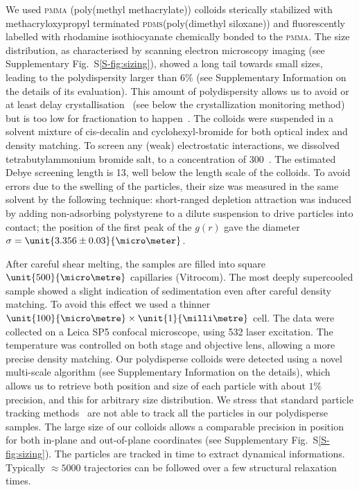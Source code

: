 We used \textsc{pmma} (poly(methyl methacrylate)) colloids sterically stabilized with methacryloxypropyl terminated \textsc{pdms}(poly(dimethyl siloxane)) and fluorescently labelled with rhodamine isothiocyanate chemically bonded to the \textsc{pmma}. The size distribution, as characterised by scanning electron microscopy imaging (see Supplementary Fig.~S\ref{S-fig:sizing}), showed a long tail towards small sizes, leading to the polydispersity larger than 6\% (see Supplementary Information on the details of its evaluation). This amount of polydispersity allows us to avoid or at least delay crystallisation~\cite{Zaccarelli2009} (see below the crystallization monitoring method) but is too low for fractionation to happen~\citep{Fasolo2003}. The colloids were suspended in a solvent mixture of cis-decalin and cyclohexyl-bromide for both optical index and density matching. To screen any (weak) electrostatic interactions, we dissolved tetrabutylammonium bromide salt, to a concentration of \unit{300}{\nano\mole\per\liter}~\citep{royall2005}. The estimated Debye screening length is \unit{13}{\nano\metre}, well below the length scale of the colloids. To avoid errors due to the swelling of the particles, their size was measured in the same solvent by the following technique: short-ranged depletion attraction was induced by adding non-adsorbing polystyrene to a dilute suspension to drive particles into contact; the position of the first peak of the $g(r)$ gave the diameter $\sigma = \unit{3.356\pm0.03}{\micro\meter}$.

After careful shear melting, the samples are filled into square $\unit{500}{\micro\metre}$ capillaries (Vitrocom). The most deeply supercooled sample showed a slight indication of sedimentation even after careful density matching. To avoid this effect we used a thinner $\unit{100}{\micro\metre}\times\unit{1}{\milli\metre}$ cell. The data were collected on a Leica SP5 confocal microscope, using \unit{532}{\nano\meter} laser excitation. The temperature was controlled on both stage and objective lens, allowing a more precise density matching. Our polydisperse colloids were detected using a novel multi-scale algorithm (see Supplementary Information on the details), which allows us to retrieve both position and size of each particle with about $1\%$ precision, and this for arbitrary size distribution. We stress that standard particle tracking methods~\cite{kegel2000swe, weeks2000} are not able to track all the particles in our polydisperse samples. The large size of our colloids allows a comparable precision in position for both in-plane and out-of-plane coordinates (see Supplementary Fig.~S\ref{S-fig:sizing}). The particles are tracked in time to extract dynamical informations. Typically $\approx 5000$ trajectories can be followed over a few structural relaxation times.

